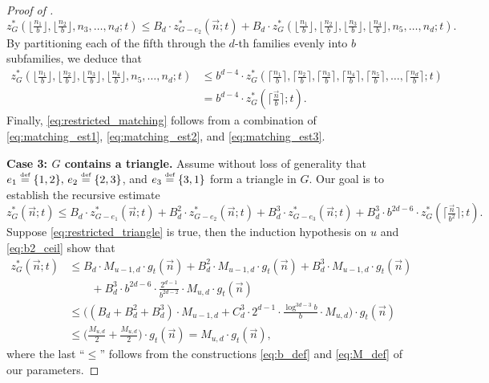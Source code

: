 \documentclass[11pt]{article}
\theoremstyle{definition}
\newcommand*{\eqdef}{\stackrel{\mbox{\normalfont\tiny def}}{=}} %
\newcommand*{\vn}{\vec{n}}
\begin{document}
\begin{proof}[Proof of ]
\begin{equation}
        z^*_G(\lfloor\tfrac{n_1}{b}\rfloor, \lfloor\tfrac{n_2}{b}\rfloor, n_3, \dots, n_d; t) \le B_d \cdot z^*_{G-e_2}(\vn; t) + B_d \cdot z^*_G(\lfloor\tfrac{n_1}{b}\rfloor, \lfloor\tfrac{n_2}{b}\rfloor,\lfloor\tfrac{n_3}{b}\rfloor,\lfloor\tfrac{n_4}{b}\rfloor, n_5, \dots, n_d; t). 
    \end{equation}
    By partitioning each of the fifth through the $d$-th families evenly into $b$ subfamilies, we deduce that
    \begin{align} 
        z^*_G(\lfloor\tfrac{n_1}{b}\rfloor, \lfloor\tfrac{n_2}{b}\rfloor,\lfloor\tfrac{n_3}{b}\rfloor,\lfloor\tfrac{n_4}{b}\rfloor, n_5, \dots, n_d; t) &\le b^{d-4} \cdot z^*_G(\lceil\tfrac{n_1}{b}\rceil, \lceil\tfrac{n_2}{b}\rceil,\lceil\tfrac{n_3}{b}\rceil,\lceil\tfrac{n_4}{b}\rceil, \lceil\tfrac{n_5}{b}\rceil, \dots, \lceil\tfrac{n_d}{b}\rceil; t)\nonumber\\
        &= b^{d-4} \cdot z^*_G(\lceil\tfrac{\vn}{b}\rceil; t). \label{eq:matching_est3}
    \end{align}
    Finally, \eqref{eq:restricted_matching} follows from a combination of \eqref{eq:matching_est1}, \eqref{eq:matching_est2}, and \eqref{eq:matching_est3}. 
    
    \medskip
    \noindent\textbf{Case 3: $G$ contains a triangle.} Assume without loss of generality that $e_1 \eqdef \{1, 2\}, \, e_2 \eqdef \{2, 3\}$, and $e_3 \eqdef \{3, 1\}$ form a triangle in $G$. Our goal is to establish the recursive estimate
    \begin{equation} \label{eq:restricted_triangle}
        z^*_G(\vn; t) \le B_d \cdot z^*_{G - e_1}(\vn; t) + B_d^2 \cdot z^*_{G - e_2}(\vn; t) + B_d^3 \cdot z^*_{G - e_3}(\vn; t) + B_d^3 \cdot b^{2d-6} \cdot z^*_G(\lceil\tfrac{\vn}{b^2}\rceil; t).
    \end{equation}
    Suppose \eqref{eq:restricted_triangle} is true, then the induction hypothesis on $u$ and \eqref{eq:b2_ceil} show that
    \begin{align*}
        z^*_G(\vn; t) &\le B_d \cdot M_{u-1, d} \cdot g_t(\vn) + B_d^2 \cdot M_{u-1, d} \cdot g_t(\vn) + B_d^3 \cdot M_{u-1, d} \cdot g_t(\vn) \\
        &\qquad + B_d^3 \cdot b^{2d-6} \cdot \tfrac{2^{d-1}}{b^{2d-2}} \cdot M_{u, d} \cdot g_t(\vn) \\
        &\le \bigl( (B_d+B_d^2+B_d^3) \cdot M_{u-1, d} + C_d^3 \cdot 2^{d-1} \cdot \tfrac{\log^{3d-3} b}{b} \cdot M_{u, d} \bigr) \cdot g_t(\vn) \\
        &\le \bigl( \tfrac{M_{u, d}}{2} + \tfrac{M_{u, d}}{2} \bigr) \cdot g_t(\vn) = M_{u, d} \cdot g_t(\vn), 
    \end{align*} 
    where the last ``$\le$'' follows from the constructions \eqref{eq:b_def} and \eqref{eq:M_def} of our parameters. 
    

\end{proof}
\end{document}
